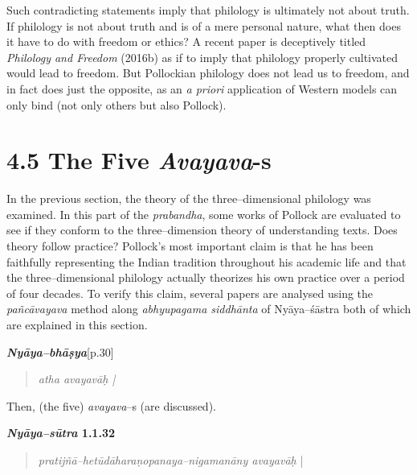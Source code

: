Such contradicting statements imply that philology is ultimately not about truth. If philology is not about truth and is of a mere personal nature, what then does it have to do with freedom or ethics? A recent paper is deceptively titled \textit{Philology and Freedom} (2016b) as if to imply that philology properly cultivated would lead to freedom. But Pollockian philology does not lead us to freedom, and in fact does just the opposite, as an \textit{a priori} application of Western models can only bind (not only others but also Pollock).

\vspace{-.3cm}

\section*{4.5 The Five {\it {\bfseries Avayava}}-s}

In the previous section, the theory of the three–dimensional philology was examined. In this part of the \textit{prabandha}, some works of Pollock are evaluated to see if they conform to the three–dimension theory of understanding texts. Does theory follow practice? Pollock’s most important claim is that he has been faithfully representing the Indian tradition throughout his academic life and that the three–dimensional philology actually theorizes his own practice over a period of four decades. To verify this claim, several papers are analysed using the \textit{pañcāvayava} method along \textit{abhyupagama siddhānta} of Nyāya–śāstra both of which are explained in this section.

\textit{\textbf{Nyāya–bhāṣya}}[p.30]

\vspace{-.3cm}

\begin{verse}
\textit{atha avayavāḥ |}
\end{verse}

\vspace{-.3cm}

Then, (the five) \textit{avayava}–s (are discussed).

\textbf{\textit{Nyāya–sūtra} 1.1.32}

\vspace{-.3cm}

\begin{verse}
\textit{pratijñā–hetūdāharaṇopanaya–nigamanāny avayavāḥ} |
\end{verse}

